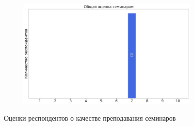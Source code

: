 \begin{figure}[H]
\begin{subfigure}[b]{0.45\textwidth}
			\end{subfigure}
			\begin{subfigure}[b]{0.45\textwidth}
				\centering
				\includegraphics[width=\textwidth]{images/4 course/Квантовая механика/seminarists-marks-Иванов М.Г.-3.png}
			\end{subfigure}	
			\caption{Оценки респондентов о качестве преподавания семинаров}
		\end{figure}

        
